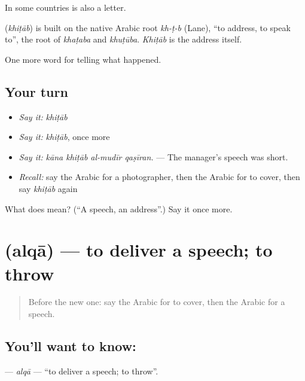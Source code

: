 In some countries  is also a letter.

\begin{cousinweb}
\textbf{} (\emph{khiṭāb}) is built on the native Arabic root \emph{kh-ṭ-b} (Lane), \textquotedblleft{}to address, to speak to\textquotedblright{}, the root of \emph{khaṭaba} and \emph{khuṭūba}. \emph{Khiṭāb} is the address itself.
\end{cousinweb}

\begin{grammarlens}[title={What you've built}]
One more word for telling what happened.
\end{grammarlens}

\subsection*{Your turn}
\begin{itemize}
\raggedright
  \item \emph{Say it:} \emph{khiṭāb}
  \item \emph{Say it:} \emph{khiṭāb}, once more
  \item \emph{Say it:} \emph{kāna khiṭāb al-mudīr qaṣīran.} — The manager’s speech was short.
  \item \emph{Recall:} say the Arabic for a photographer, then the Arabic for to cover, then say \emph{khiṭāb} again
\end{itemize}

\begin{tcolorbox}[breakable,colback=teal!4,colframe=teal!35!black,title={Before you move on}]
What does  mean? (\textquotedblleft{}A speech, an address\textquotedblright{}.) Say it once more.
\end{tcolorbox}
\section[\texorpdfstring{\ar{ألقى} (alqā)}{ألقى (alqā)}]{ (alqā) — to deliver a speech; to throw}

\label{lesson:AR-C357-alqa}



\begin{quote}
Before the new one: say the Arabic for to cover, then the Arabic for a speech.
\end{quote}

\subsection*{You'll want to know: }
\textbf{} — \emph{alqā} — \textquotedblleft{}to deliver a speech; to throw\textquotedblright{}.

